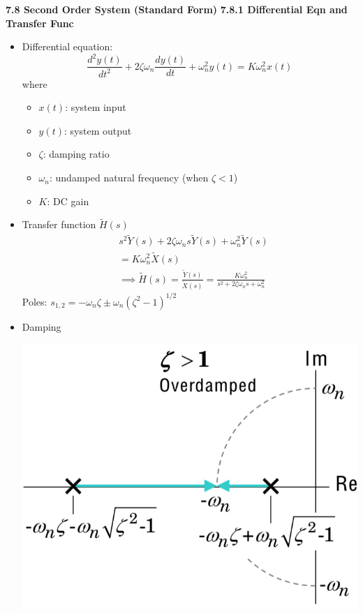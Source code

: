 \documentclass[landscape,a4paper]{extarticle}
\newenvironment{Figure}
  {\par\medskip\noindent\minipage{\linewidth}}
  {\endminipage\par\medskip}
\begin{document}
\begin{multicols*}{5}
    \textbf{7.8 Second Order System (Standard Form)}
    \textbf{7.8.1 Differential Eqn and Transfer Func}
    \begin{itemize}
        \item Differential equation:
        \[
            \frac{d^2y(t)}{dt^2} + 2 \zeta \omega_n \frac{dy(t)}{dt} + \omega_n^2 y(t) = K \omega_n^2 x(t) \tag{7.28}
        \]
        where
        \begin{itemize}
            \item $x(t)$: system input
            \item $y(t)$: system output
            \item $\zeta$: damping ratio
            \item $\omega_n$: undamped natural frequency (when $\zeta < 1$)
            \item $K$: DC gain
        \end{itemize}
        \item Transfer function $\tilde{H}(s)$
        \begin{align*}
            &s^2 \tilde{Y}(s) + 2 \zeta \omega_ns\tilde{Y}(s) + \omega_n^2\tilde{Y}(s)\\ 
            &= K \omega_n^2\tilde{X}(s)\\
            &\implies \tilde{H}(s) = \frac{\tilde{Y}(s)}{\tilde{X}(s)} = \frac{K \omega_n^2}{s^2 + 2 \zeta \omega_n s + \omega_n^2} \tag{7.29}
        \end{align*}
        Poles: $s_{1,2} = -\omega_n \zeta \pm \omega_n\left(\zeta^2 - 1\right)^{1/2}$
        \item Damping
        \begin{Figure}
            \centering
            \includegraphics[width=\linewidth]{overdamped.png}                

\end{Figure}
\end{itemize}
\end{multicols*}
\end{document}
